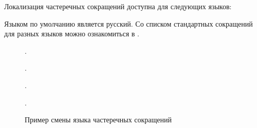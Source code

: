Локализация частеречных сокращений доступна для следующих языков:

Языком по умолчанию является русский. Со списком стандартных сокращений для разных языков
можно ознакомиться в .

\begin{figure}[H]
    \centering
    \begin{minipage}[c]{0.5\textwidth}
        \begin{Latexcode}
             
             
            .

             
             
             .
        \end{Latexcode}
    \end{minipage}
    \hfill
    \begin{minipage}[c]{0.4\textwidth}
        \small
           .
        \vspace*{\baselineskip}

          
          .
    \end{minipage}

    \caption{Пример смены языка частеречных сокращений}
\end{figure}